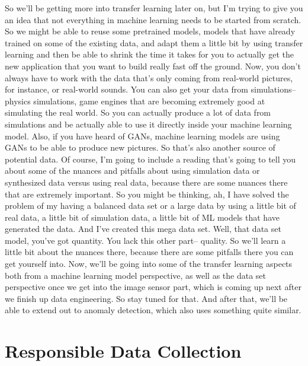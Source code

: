 So we'll be getting more into transfer learning later on,
but I'm trying to give you an idea that not everything in machine learning
needs to be started from scratch.
So we might be able to reuse some pretrained models, models
that have already trained on some of the existing data,
and adapt them a little bit by using transfer learning
and then be able to shrink the time it takes for you to actually get
the new application that you want to build really fast off the ground.
Now, you don't always have to work with the data that's
only coming from real-world pictures, for instance, or real-world sounds.
You can also get your data from simulations--
physics simulations, game engines that are becoming extremely
good at simulating the real world.
So you can actually produce a lot of data from simulations
and be actually able to use it directly inside your machine learning model.
Also, if you have heard of GANs, machine learning models
are using GANs to be able to produce new pictures.
So that's also another source of potential data.
Of course, I'm going to include a reading that's
going to tell you about some of the nuances and pitfalls
about using simulation data or synthesized data versus using
real data, because there are some nuances there
that are extremely important.
So you might be thinking, ah, I have solved
the problem of my having a balanced data set or a large data
by using a little bit of real data, a little bit of simulation data,
a little bit of ML models that have generated the data.
And I've created this mega data set.
Well, that data set model, you've got quantity.
You lack this other part-- quality.
So we'll learn a little bit about the nuances
there, because there are some pitfalls there you can get yourself into.
Now, we'll be going into some of the transfer
learning aspects both from a machine learning model perspective, as well
as the data set perspective once we get into the image sensor part,
which is coming up next after we finish up data engineering.
So stay tuned for that.
And after that, we'll be able to extend out to anomaly detection, which
also uses something quite similar.

\section{Responsible Data Collection}

